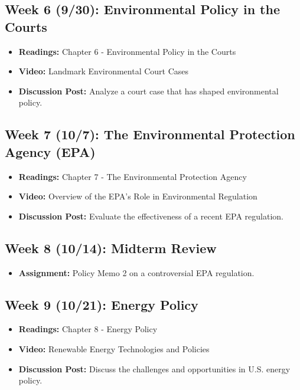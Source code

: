 \documentclass[12pt, letterpaper]{article}
\begin{document}
\subsection*{Week 6 (9/30): Environmental Policy in the Courts}
\begin{itemize}
    \item \textbf{Readings:} Chapter 6 - Environmental Policy in the Courts
    \item \textbf{Video:} Landmark Environmental Court Cases
    \item \textbf{Discussion Post:} Analyze a court case that has shaped environmental policy.
\end{itemize}

\subsection*{Week 7 (10/7): The Environmental Protection Agency (EPA)}
\begin{itemize}
    \item \textbf{Readings:} Chapter 7 - The Environmental Protection Agency
    \item \textbf{Video:} Overview of the EPA's Role in Environmental Regulation
    \item \textbf{Discussion Post:} Evaluate the effectiveness of a recent EPA regulation.
\end{itemize}

\subsection*{Week 8 (10/14): Midterm Review}
\begin{itemize}
    \item \textbf{Assignment:} Policy Memo 2 on a controversial EPA regulation.
\end{itemize}

\subsection*{Week 9 (10/21): Energy Policy}
\begin{itemize}
    \item \textbf{Readings:} Chapter 8 - Energy Policy
    \item \textbf{Video:} Renewable Energy Technologies and Policies
    \item \textbf{Discussion Post:} Discuss the challenges and opportunities in U.S. energy policy.
\end{itemize}
\end{document}
